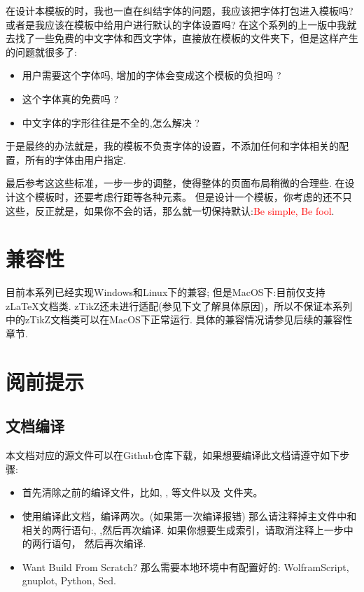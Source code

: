 在设计本模板的时，我也一直在纠结字体的问题，我应该把字体打包进入模板吗? 或者是我应该在模板中给用户进行默认的字体设置吗?
在这个系列的上一版中我就去找了一些免费的中文字体和西文字体，直接放在模板的文件夹下，但是这样产生的问题就很多了:

\begin{itemize}
    \item 用户需要这个字体吗, 增加的字体会变成这个模板的负担吗 ?
    \item 这个字体真的免费吗 ?
    \item 中文字体的字形往往是不全的,怎么解决 ? 
\end{itemize}

于是最终的办法就是，我的模板不负责字体的设置，不添加任何和字体相关的配置，所有的字体由用户指定. 


最后参考这这些标准，一步一步的调整，使得整体的页面布局稍微的合理些. 在设计这个模板时，还要考虑行距等各种元素。
但是设计一个模板，你考虑的还不只这些，反正就是，如果你不会的话，那么就一切保持默认:\textcolor{red}{Be simple, Be fool}.

\section{兼容性}
目前本系列已经实现Windows和Linux下的兼容; 但是MacOS下:目前仅支持z\LaTeX{}文档类.
zTikZ还未进行适配(参见下文了解具体原因)，所以不保证本系列中的zTikZ文档类可以在MacOS下正常运行.
具体的兼容情况请参见后续的兼容性章节.


\section{阅前提示}
\subsection{文档编译}
本文档对应的源文件可以在Github仓库下载，如果想要编译此文档请遵守如下步骤:
\begin{itemize}
    \item 首先清除之前的编译文件，比如, , 等文件以及
        文件夹。
    \item 使用编译此文档，编译两次。(如果第一次编译报错)
        那么请注释掉主文件中和相关的两行语句:\cmd{\makeindex[]{}},
        \cmd{\printindex[]{}},然后再次编译. 如果你想要生成索引，请取消注释上一步中的两行语句，
        然后再次编译.
    \item Want Build From Scratch? 那么需要本地环境中有配置好的: WolframScript, gnuplot, Python, Sed.
\end{itemize}

